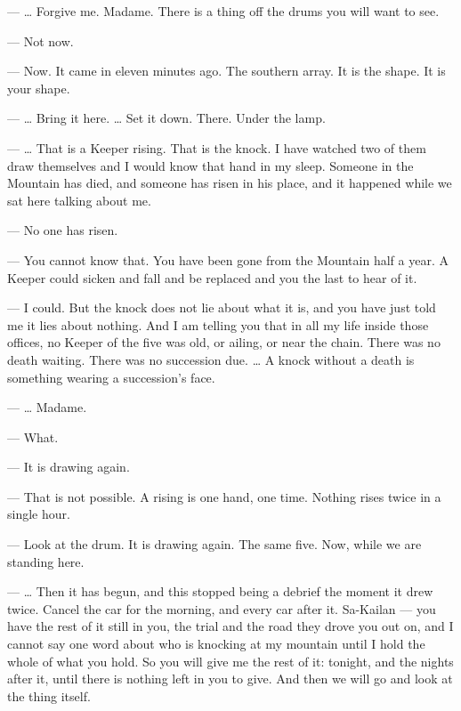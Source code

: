 \begin{room}

--- \ldots{} Forgive me. Madame. There is a thing off the drums you will want to see.

--- Not now.

--- Now. It came in eleven minutes ago. The southern array. It is the shape. It is your shape.

--- \ldots{} Bring it here. \ldots{} Set it down. There. Under the lamp.

--- \ldots{} That is a Keeper rising. That is the knock. I have watched two of them draw themselves and I would know that hand in my sleep. Someone in the Mountain has died, and someone has risen in his place, and it happened while we sat here talking about me.

--- No one has risen.

--- You cannot know that. You have been gone from the Mountain half a year. A Keeper could sicken and fall and be replaced and you the last to hear of it.

--- I could. But the knock does not lie about what it is, and you have just told me it lies about nothing. And I am telling you that in all my life inside those offices, no Keeper of the five was old, or ailing, or near the chain. There was no death waiting. There was no succession due. \ldots{} A knock without a death is something wearing a succession's face.

--- \ldots{} Madame.

--- What.

--- It is drawing again.

--- That is not possible. A rising is one hand, one time. Nothing rises twice in a single hour.

--- Look at the drum. It is drawing again. The same five. Now, while we are standing here.

--- \ldots{} Then it has begun, and this stopped being a debrief the moment it drew twice. Cancel the car for the morning, and every car after it. Sa-Kailan --- you have the rest of it still in you, the trial and the road they drove you out on, and I cannot say one word about who is knocking at my mountain until I hold the whole of what you hold. So you will give me the rest of it: tonight, and the nights after it, until there is nothing left in you to give. And then we will go and look at the thing itself.

\end{room}
